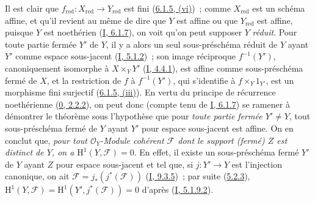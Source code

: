 Il est clair que
$f_{\mathrm{red}}:X_{\mathrm{red}}\to Y_{\mathrm{red}}$ est fini
(\hyperref[II.6.1.5-fr]{6.1.5, (vi)})~; comme $X_{\mathrm{red}}$ est un
schéma affine, et qu'il revient au même de dire que $Y$ est affine ou que
$Y_{\mathrm{red}}$ est affine, puisque $Y$ est noethérien
(\hyperref[I.6.1.7-fr]{I, 6.1.7}), on voit qu'on peut supposer $Y$
\emph{réduit}. Pour toute partie fermée $Y'$ de $Y$, il y a alors un seul
sous-préschéma réduit de $Y$ ayant $Y'$ comme espace sous-jacent
(\hyperref[I.5.1.2-fr]{I, 5.1.2})~; son image réciproque $f^{-1}(Y')$,
canoniquement isomorphe à $X\times_Y Y'$
(\hyperref[I.4.4.1-fr]{I, 4.4.1}), est affine comme sous-préschéma fermé de
$X$, et la restriction de $f$ à $f^{-1}(Y')$, qui s'identifie à
$f\times_Y 1_{Y'}$, est un morphisme fini surjectif
(\hyperref[II.6.1.5-fr]{6.1.5, (iii)}). En vertu du principe de récurrence
noethérienne (\hyperref[0.2.2.2-fr]{0, 2.2.2}), on peut donc (compte tenu de
\hyperref[I.6.1.7-fr]{I, 6.1.7}) se ramener à démontrer le théorème sous
l'hypothèse que pour \emph{toute partie fermée $Y'\neq Y$}, tout
sous-préschéma fermé de $Y$ ayant $Y'$ pour espace sous-jacent est affine.
On en conclut que, \emph{pour tout $\mathcal{O}_Y$-Module cohérent
$\mathcal{F}$ dont le support (fermé) $Z$ est distinct de $Y$, on a
$\mathrm{H}^1(Y,\mathcal{F})=0$}. En effet, il existe un sous-préschéma fermé
$Y'$ de $Y$ ayant $Z$ pour espace sous-jacent et tel que, si $j:Y'\to Y$ est
l'injection canonique, on ait
$\mathcal{F}=j_*(j^*(\mathcal{F}))$
(\hyperref[I.9.3.5-fr]{I, 9.3.5})~; par suite
(\hyperref[II.5.2.3-fr]{5.2.3}),
$\mathrm{H}^1(Y,\mathcal{F})
=\mathrm{H}^1(Y',j^*(\mathcal{F}))=0$ d'après
(\hyperref[I.5.1.9.2-fr]{I, 5.1.9.2}).

